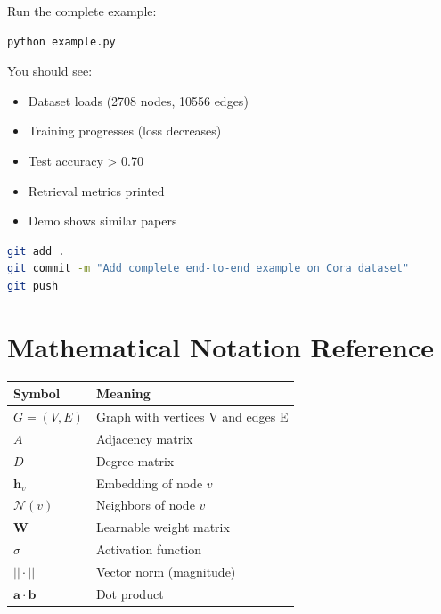 \documentclass[12pt,a4paper]{article}
\begin{document}
\begin{checkpoint}
Run the complete example:
\begin{lstlisting}[language=bash]
python example.py
\end{lstlisting}

You should see:
\begin{itemize}
    \item[$\square$] Dataset loads (2708 nodes, 10556 edges)
    \item[$\square$] Training progresses (loss decreases)
    \item[$\square$] Test accuracy > 0.70
    \item[$\square$] Retrieval metrics printed
    \item[$\square$] Demo shows similar papers
\end{itemize}
\end{checkpoint}

\begin{gitcommit}
\begin{lstlisting}[language=bash]
git add .
git commit -m "Add complete end-to-end example on Cora dataset"
git push
\end{lstlisting}
\end{gitcommit}

\appendix

\section{Mathematical Notation Reference}

\begin{tabular}{|l|l|}
\hline
\textbf{Symbol} & \textbf{Meaning} \\
\hline
$G = (V, E)$ & Graph with vertices V and edges E \\
$A$ & Adjacency matrix \\
$D$ & Degree matrix \\
$\mathbf{h}_v$ & Embedding of node $v$ \\
$\mathcal{N}(v)$ & Neighbors of node $v$ \\
$\mathbf{W}$ & Learnable weight matrix \\
$\sigma$ & Activation function \\
$||\cdot||$ & Vector norm (magnitude) \\
$\mathbf{a} \cdot \mathbf{b}$ & Dot product \\
\hline
\end{tabular}
\end{document}
